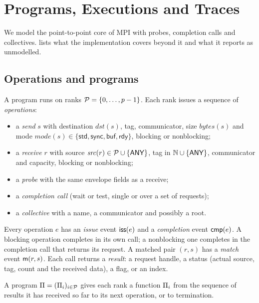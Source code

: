 \section{Programs, Executions and Traces}
\label{sec:model}

We model the point-to-point core of MPI with probes, completion calls and collectives.
 lists what the implementation covers beyond it and what it
reports as unmodelled.

\subsection{Operations and programs}

A program runs on ranks $\mathcal{P}=\{0,\dots,p-1\}$. Each rank issues a sequence of
\emph{operations}:
\begin{itemize}[leftmargin=*]
\item a \emph{send} $s$ with destination $\mathit{dst}(s)$, tag, communicator, size
  $\mathit{bytes}(s)$ and mode $\mathit{mode}(s)\in\{\mathsf{std},\allowbreak\mathsf{sync},\allowbreak
  \mathsf{buf},\allowbreak\mathsf{rdy}\}$, blocking or nonblocking;
\item a \emph{receive} $r$ with source $\mathit{src}(r)\in\mathcal{P}\cup\{\textsf{ANY}\}$, tag in
  $\mathbb{N}\cup\{\textsf{ANY}\}$, communicator and capacity, blocking or nonblocking;
\item a \emph{probe} with the same envelope fields as a receive;
\item a \emph{completion call} (wait or test, single or over a set of requests);
\item a \emph{collective} with a name, a communicator and possibly a root.
\end{itemize}
Every operation $e$ has an \emph{issue} event $\mathsf{iss}(e)$ and a \emph{completion} event
$\mathsf{cmp}(e)$. A blocking operation completes in its own call; a nonblocking one completes
in the completion call that returns its request. A matched pair $(r,s)$ has a \emph{match}
event $\mathsf{m}(r,s)$. Each call returns a \emph{result}: a request handle, a status (actual
source, tag, count and the received data), a flag, or an index.

\begin{definition}[Program]
A program $\Pi=(\Pi_i)_{i\in\mathcal{P}}$ gives each rank a function $\Pi_i$ from the
sequence of results it has received so far to its next operation, or to termination.
\end{definition}

